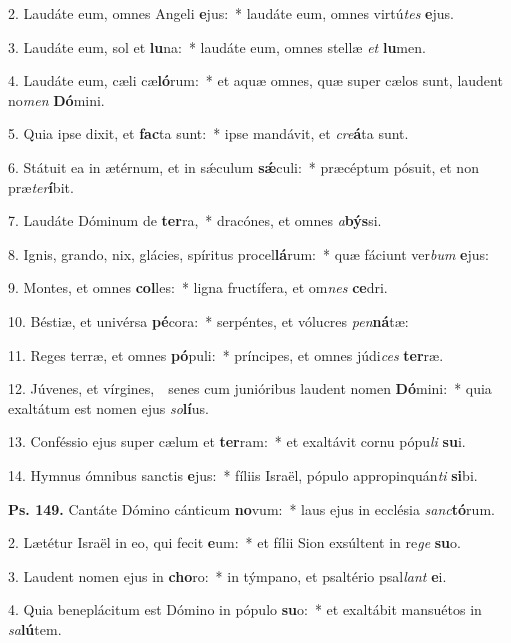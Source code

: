 
2. Laudáte eum, omnes Angeli \textbf{e}jus:~* laudáte eum, omnes virtú\textit{tes} \textbf{e}jus.

3. Laudáte eum, sol et \textbf{lu}na:~* laudáte eum, omnes stellæ \textit{et} \textbf{lu}men.

4. Laudáte eum, cæli cæ\textbf{ló}rum:~* et aquæ omnes, quæ super cælos sunt, laudent no\textit{men} \textbf{Dó}mini.

5. Quia ipse dixit, et \textbf{fac}ta sunt:~* ipse mandávit, et \textit{cre}\textbf{á}ta sunt.

6. Státuit ea in ætérnum, et in s\'{\ae}culum \textbf{s\'{\ae}}culi:~* præcéptum pósuit, et non præ\textit{ter}\textbf{í}bit.

7. Laudáte Dóminum de \textbf{ter}ra,~* dracónes, et omnes \textit{a}\textbf{býs}si.

8. Ignis, grando, nix, glácies, spíritus procel\textbf{lá}rum:~* quæ fáciunt ver\textit{bum} \textbf{e}jus:

9. Montes, et omnes \textbf{col}les:~* ligna fructífera, et om\textit{nes} \textbf{ce}dri.

10. Béstiæ, et univérsa \textbf{pé}cora:~* serpéntes, et vólucres \textit{pen}\textbf{ná}tæ:

11. Reges terræ, et omnes \textbf{pó}puli:~* príncipes, et omnes júdi\textit{ces} \textbf{ter}ræ.

12. Júvenes, et vírgines,~\GreDagger\ senes cum junióribus laudent nomen \textbf{Dó}mini:~* quia exaltátum est nomen ejus \textit{so}\textbf{lí}us.

13. Conféssio ejus super cælum et \textbf{ter}ram:~* et exaltávit cornu pópu\textit{li} \textbf{su}i.

14. Hymnus ómnibus sanctis \textbf{e}jus:~* fíliis Israël, pópulo appropinquán\textit{ti} \textbf{si}bi.

\textbf{Ps. 149.} Cantáte Dómino cánticum \textbf{no}vum:~* laus ejus in ecclésia \textit{sanc}\textbf{tó}rum.

2. Lætétur Israël in eo, qui fecit \textbf{e}um:~* et fílii Sion exsúltent in re\textit{ge} \textbf{su}o.

3. Laudent nomen ejus in \textbf{cho}ro:~* in týmpano, et psaltério psal\textit{lant} \textbf{e}i.

4. Quia beneplácitum est Dómino in pópulo \textbf{su}o:~* et exaltábit mansuétos in \textit{sa}\textbf{lú}tem.

